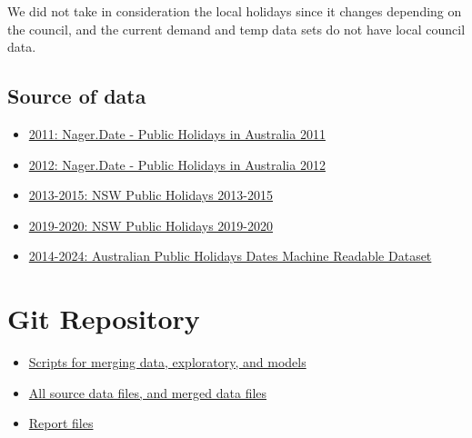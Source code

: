 \documentclass[mstat,12pt]{unswthesis}
\begin{document}
We did not take in consideration the local holidays since it changes
depending on the council, and the current demand and temp data sets do
not have local council data.

\hypertarget{source-of-data}{%
\subsection{Source of data}\label{source-of-data}}

\begin{itemize}
\tightlist
\item
  \href{https://date.nager.at/PublicHoliday/Australia/2011}{2011:
  Nager.Date - Public Holidays in Australia 2011}
\item
  \href{https://date.nager.at/PublicHoliday/Australia/2012}{2012:
  Nager.Date - Public Holidays in Australia 2012}
\item
  \href{https://www.industrialrelations.nsw.gov.au/public-holidays/public-holidays-in-nsw/nsw-public-holidays-2013-2015/}{2013-2015:
  NSW Public Holidays 2013-2015}
\item
  \href{https://www.industrialrelations.nsw.gov.au/public-holidays/public-holidays-in-nsw/nsw-public-holidays-2019-2020/}{2019-2020:
  NSW Public Holidays 2019-2020}
\item
  \href{https://data.gov.au/data/dataset/australian-holidays-machine-readable-dataset}{2014-2024:
  Australian Public Holidays Dates Machine Readable Dataset}
\end{itemize}

\hypertarget{git-repository}{%
\section{Git Repository}\label{git-repository}}

\begin{itemize}
\tightlist
\item
  \href{https://github.com/van-hai-ho/ZZSC9020_Project_Group_K/blob/main/src/README.md}{Scripts
  for merging data, exploratory, and models}
\item
  \href{https://github.com/van-hai-ho/ZZSC9020_Project_Group_K/tree/main/data}{All
  source data files, and merged data files}
\item
  \href{https://github.com/van-hai-ho/ZZSC9020_Project_Group_K/tree/main/report/Group_Report}{Report
  files}
\end{itemize}
\end{document}
